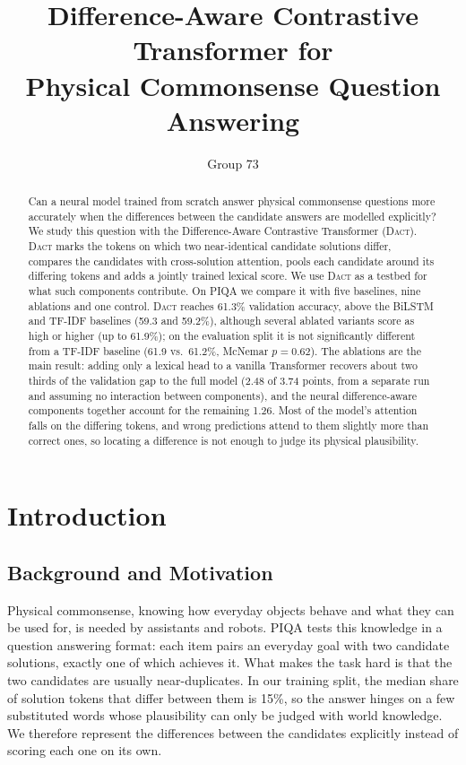 \documentclass[11pt]{article}
\title{Difference-Aware Contrastive Transformer for\\Physical Commonsense Question Answering}
\author{Group 73}
\newcommand{\dact}{\textsc{Dact}}
\begin{document}
\maketitle

\begin{abstract}
Can a neural model trained from scratch answer physical commonsense questions more accurately when the differences between the candidate answers are modelled explicitly? We study this question with the Difference-Aware Contrastive Transformer (\dact{}). \dact{} marks the tokens on which two near-identical candidate solutions differ, compares the candidates with cross-solution attention, pools each candidate around its differing tokens and adds a jointly trained lexical score. We use \dact{} as a testbed for what such components contribute. On PIQA we compare it with five baselines, nine ablations and one control. \dact{} reaches 61.3\% validation accuracy, above the BiLSTM and TF-IDF baselines (59.3 and 59.2\%), although several ablated variants score as high or higher (up to 61.9\%); on the evaluation split it is not significantly different from a TF-IDF baseline (61.9 vs.\ 61.2\%, McNemar $p{=}0.62$). The ablations are the main result: adding only a lexical head to a vanilla Transformer recovers about two thirds of the validation gap to the full model (2.48 of 3.74 points, from a separate run and assuming no interaction between components), and the neural difference-aware components together account for the remaining 1.26. Most of the model's attention falls on the differing tokens, and wrong predictions attend to them slightly more than correct ones, so locating a difference is not enough to judge its physical plausibility.
\end{abstract}

\section{Introduction}

\subsection{Background and Motivation}
Physical commonsense, knowing how everyday objects behave and what they can be used for, is needed by assistants and robots. PIQA \cite{bisk2020piqa} tests this knowledge in a question answering format: each item pairs an everyday goal with two candidate solutions, exactly one of which achieves it. What makes the task hard is that the two candidates are usually near-duplicates. In our training split, the median share of solution tokens that differ between them is 15\%, so the answer hinges on a few substituted words whose plausibility can only be judged with world knowledge. We therefore represent the differences between the candidates explicitly instead of scoring each one on its own.
\end{document}
